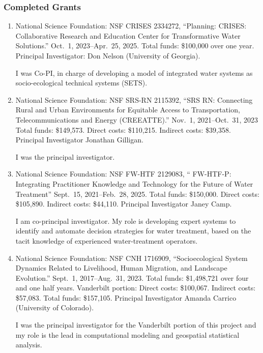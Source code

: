 \subsubsection{Completed Grants}
\begin{enumerate}
%
%
%
\item National Science Foundation: NSF CRISES 2334272,
``Planning: CRISES: Collaborative Research and Education Center for Transformative
Water Solutions.''
Oct.~1, 2023--Apr.~25, 2025.
Total funds: \$100,000 over one year.
Principal Investigator: Don Nelson (University of Georgia).
\begin{credit}
	I was Co-PI, in charge of developing a model of integrated water systems as socio-ecological technical systems (SETS).
\end{credit}
%
%
\item National Science Foundation: NSF SRS-RN 2115392,
``SRS RN: Connecting Rural and Urban Environments for Equitable Access to
Transportation, Telecommunications and Energy (CREEATTE).''
Nov.~1, 2021--Oct.~31, 2023
Total funds: \$149,573. Direct costs: \$110,215. Indirect costs: \$39,358.
Principal Investigator Jonathan Gilligan.
\begin{credit}
	I was the principal investigator.
\end{credit}
%
%
\item National Science Foundation: NSF FW-HTF 2129083,
`` FW-HTF-P: Integrating Practitioner Knowledge and Technology for the Future of Water Treatment''
Sept.~15, 2021--Feb.~28, 2025.
Total funds: \$150,000. Direct costs: \$105,890. Indirect costs: \$44,110.
Principal Investigator Janey Camp.
\begin{credit}
	I am co-principal investigator. My role is developing expert systems to
	identify and automate decision strategies for water treatment, based on the
	tacit knowledge of experienced water-treatment operators.
\end{credit}
%
\item National Science Foundation: NSF CNH 1716909,
``Socioecological System Dynamics Related to Livelihood, Human Migration, and Landscape Evolution.''
Sept.~1, 2017--Aug.~31, 2023.
Total funds: \$1,498,721 over four and one half years. Vanderbilt portion: Direct costs: \$100,067. Indirect costs: \$57,083. Total funds: \$157,105.
Principal Investigator Amanda Carrico (University of Colorado).
\begin{credit}
	I was the principal investigator for the Vanderbilt portion of this project and my role is the lead in computational modeling and geospatial statistical analysis.

\end{credit}
\end{enumerate}
